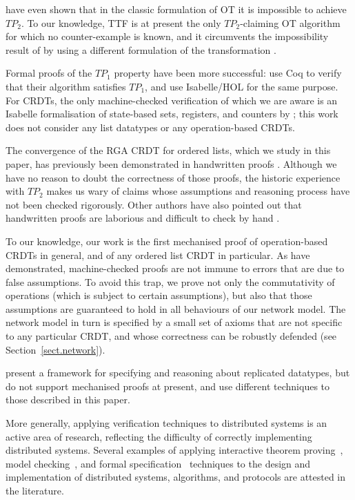 \citet{Randolph:2015gj} have even shown that in the classic formulation of OT it is impossible to
achieve $\mathit{TP}_2$. To our knowledge, TTF is at present the only $\mathit{TP}_2$-claiming OT
algorithm for which no counter-example is known, and it circumvents the impossibility result of
\citet{Randolph:2015gj} by using a different formulation of the transformation
\cite{Oster:2006tr,Levien:2016wz}.

Formal proofs of the $\mathit{TP}_1$ property have been more successful: \citet{Sinchuk:2016cf} use Coq to verify that their algorithm satisfies $\mathit{TP}_1$, and \citet{Jungnickel:2015ua} use Isabelle/HOL for the same purpose.
For CRDTs, the only machine-checked verification of which we are aware is an Isabelle formalisation of state-based sets, registers, and counters by \citet{Zeller:2014fl}; this work does not consider any list datatypes or any operation-based CRDTs.

The convergence of the RGA CRDT for ordered lists, which we study in this paper, has previously been
demonstrated in handwritten proofs \cite{Attiya:2016kh,Kleppmann:2016ve,Roh:2009ws}. Although we
have no reason to doubt the correctness of those proofs, the historic experience with
$\mathit{TP}_2$ makes us wary of claims whose assumptions and reasoning process have not been
checked rigorously. Other authors have also pointed out that handwritten proofs are laborious and
difficult to check by hand \cite{Li:2008hw,Li:2005jq}.

To our knowledge, our work is the first mechanised proof of operation-based CRDTs in general, and of
any ordered list CRDT in particular. As \citet{Oster:2005vi} have demonstrated, machine-checked
proofs are not immune to errors that are due to false assumptions. To avoid this trap, we prove not
only the commutativity of operations (which is subject to certain assumptions), but also that those
assumptions are guaranteed to hold in all behaviours of our network model. The network model in turn
is specified by a small set of axioms that are not specific to any particular CRDT, and whose
correctness can be robustly defended (see Section~\ref{sect.network}).

\citet{Burckhardt:2014ft} present a framework for specifying and reasoning about replicated datatypes, but do not support mechanised proofs at present, and use different techniques to those described in this paper.

More generally, applying verification techniques to distributed systems is an active area of research, reflecting the difficulty of correctly implementing distributed systems.
Several examples of applying interactive theorem proving~\cite{DBLP:conf/pldi/WilcoxWPTWEA15,DBLP:journals/afp/DebratM12,DBLP:conf/sss/Charron-BostDM11}, model checking~\cite{DBLP:conf/asm/AzmyMW16,DBLP:journals/entcs/JohnsonLLV04}, and formal specification~\cite{DBLP:journals/ijaacs/TounsiMM16,DBLP:conf/asm/AndriamiarinaMS14,DBLP:conf/wetice/TounsiMM13} techniques to the design and implementation of distributed systems, algorithms, and protocols are attested in the literature.
